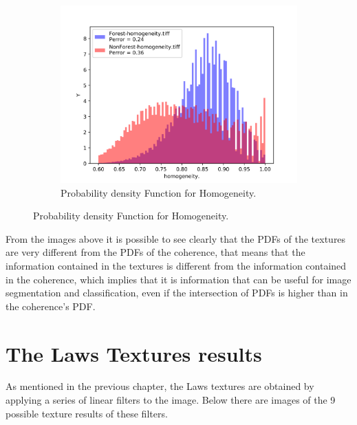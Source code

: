 \begin{figure}[H]
\begin{subfigure}[b]{0.4\linewidth}
    \includegraphics[width=\linewidth]{Chapter4/glcm_textures/homogeneity_hist.png}
     \caption{Probability density Function for Homogeneity.}
  \end{subfigure}
\end{figure}

From the images above it is possible to see clearly that the PDFs of the textures are very different from the PDFs of the coherence, that means that the information contained in the textures is different from the information contained in the coherence, which implies that it is information that can be useful for image segmentation and classification, even if the intersection of PDFs is higher than in the coherence's PDF. 


\section{The Laws Textures results}
\label{sec:laws_textures_results}
As mentioned in the previous chapter, the Laws textures are obtained by applying a series of linear filters to the image. Below there are images of the 9 possible texture results of these filters.

